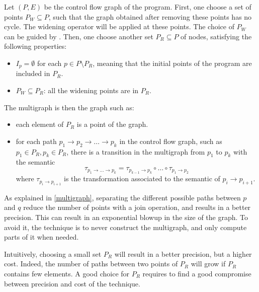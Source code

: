 \documentclass[a4paper,english,titlepage,11pt]{article}
\begin{document}
	Let $(P,E)$ be the control flow graph of the program.
	First, one choose a set of points $P_W \subseteq P$, such that the graph
	obtained after removing these points has no cycle. The widening operator
	will be applied at these points. The choice of $P_W$ can be guided by
	\cite{Bou92}.
	Then, one choose another set $P_R \subseteq P$ of nodes, satisfying the
	following properties:
	\begin{itemize}
	\item $I_p = \emptyset$ for each $p \in P \setminus P_R$, meaning that the initial
	points of the program are included in $P_R$.
	\item $P_W \subseteq P_R$: all the widening points are in $P_R$.
	\end{itemize} 

	The multigraph is then the graph such as:
	\begin{itemize}
	\item each element of $P_R$ is a point of the graph.
	\item for each path $p_1 \rightarrow p_2 \rightarrow \dots \rightarrow p_k$
	in the control flow graph, such as $p_1 \in P_R, p_k \in P_R$,
	there is a transition in the multigraph from $p_1$ to $p_k$ with the
	semantic $$\tau_{p_1 \rightarrow \dots \rightarrow p_k} = \tau_{p_{k-1}
	\rightarrow p_k} \circ
	\dots \circ \tau_{p_1 \rightarrow p_2}$$ where $\tau_{p_i \rightarrow
	p_{i+1}}$ is the transformation associated to the semantic of $p_i
	\rightarrow p_{i+1}$.
	\end{itemize}

	As explained in \ref{multigraph}, separating the different
	possible paths between $p$ and $q$ reduce the number of points with a join
	operation, and results in a better precision.
	This can result in an exponential blowup in the size of the graph. To avoid
	it, the technique is to never construct the multigraph, and only compute
	parts of it when needed.

	Intuitively, choosing a small set $P_R$ will result in a better precision,
	but a higher cost. 
	Indeed, the number of paths between two points of $P_R$ will grow if $P_R$
	contains few elements.
	A good choice for $P_R$ requires to find a good
	compromise between precision and cost of the technique.
\end{document}
